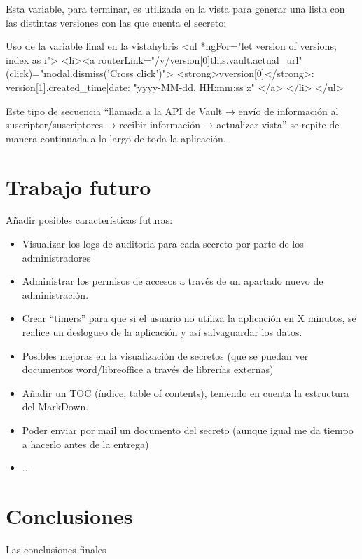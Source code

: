 \documentclass{\ClassPath/viu-tfm-template}
\begin{document}
Esta variable, para terminar, es utilizada en la vista para generar una lista con las distintas versiones con las que cuenta el secreto:

\begin{mycode}{Uso de la variable final en la vista}{hybris}{}
<ul *ngFor="let version of versions; index as i">
  <li><a routerLink="/v/{{version[0]}}{{this.vault.actual_url}}"
    (click)="modal.dismiss('Cross click')">
      <strong>v{{version[0]}}</strong>:
        {{version[1].created_time|date: "yyyy-MM-dd, HH:mm:ss z"}}
    </a>
  </li>
</ul>
\end{mycode}

Este tipo de secuencia “llamada a la API de Vault → envío de información al suscriptor/suscriptores → recibir información → actualizar vista” se repite de manera continuada a lo largo de toda la aplicación.


\chapter{Trabajo futuro}



{\color{red} Añadir posibles características futuras:

    \begin{itemize}
        \item Visualizar los logs de auditoria para cada secreto por parte de los administradores
        \item Administrar los permisos de accesos a través de un apartado nuevo de administración.
        \item Crear “timers” para que si el usuario no utiliza la aplicación en X minutos, se realice un deslogueo de la aplicación y así salvaguardar los datos.
        \item Posibles mejoras en la visualización de secretos (que se puedan ver documentos word/libreoffice a través de librerías externas)
        \item Añadir un TOC (índice, table of contents), teniendo en cuenta la estructura del MarkDown.
        \item Poder enviar por mail un documento del secreto (aunque igual me da tiempo a hacerlo antes de la entrega)
        \item ...
    \end{itemize}
}


\vfill
\pagebreak
\chapter{Conclusiones}
{\color{red} Las conclusiones finales}

\vfill

\pagebreak
\printbibliography[title={Referencias bibliográficas},heading=bibintoc]

\end{document}
